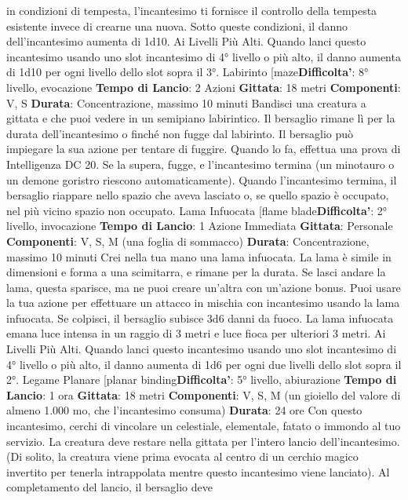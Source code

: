 \begin{multicols}{2}
in condizioni di tempesta, l’incantesimo ti fornisce il
controllo della tempesta esistente invece di crearne una
nuova. Sotto queste condizioni, il danno
dell’incantesimo aumenta di 1d10.
Ai Livelli Più Alti. Quando lanci questo incantesimo
usando uno slot incantesimo di 4° livello o più alto, il
danno aumenta di 1d10 per ogni livello dello slot sopra
il 3°.
Labirinto
[maze\textbf{Difficolta'}:
8° livello, evocazione
\textbf{Tempo di Lancio}: 2 Azioni
\textbf{Gittata}: 18 metri
\textbf{Componenti}: V, S
\textbf{Durata}: Concentrazione, massimo 10 minuti
Bandisci una creatura a gittata e che puoi vedere in un
semipiano labirintico. Il bersaglio rimane lì per la durata
dell’incantesimo o finché non fugge dal labirinto.
Il bersaglio può impiegare la sua azione per tentare di
fuggire. Quando lo fa, effettua una prova di Intelligenza
DC 20. Se la supera, fugge, e l’incantesimo termina (un
minotauro o un demone goristro riescono
automaticamente).
Quando l’incantesimo termina, il bersaglio riappare
nello spazio che aveva lasciato o, se quello spazio è
occupato, nel più vicino spazio non occupato.
Lama Infuocata
[flame blade\textbf{Difficolta'}:
2° livello, invocazione
\textbf{Tempo di Lancio}: 1 Azione Immediata
\textbf{Gittata}: Personale
\textbf{Componenti}: V, S, M (una foglia di sommacco)
\textbf{Durata}: Concentrazione, massimo 10 minuti
Crei nella tua mano una lama infuocata. La lama è
simile in dimensioni e forma a una scimitarra, e rimane
per la durata. Se lasci andare la lama, questa sparisce,
ma ne puoi creare un’altra con un’azione bonus.
Puoi usare la tua azione per effettuare un attacco in
mischia con incantesimo usando la lama infuocata. Se
colpisci, il bersaglio subisce 3d6 danni da fuoco.
La lama infuocata emana luce intensa in un raggio di 3
metri e luce fioca per ulteriori 3 metri.
Ai Livelli Più Alti. Quando lanci questo incantesimo
usando uno slot incantesimo di 4° livello o più alto, il
danno aumenta di 1d6 per ogni due livelli dello slot
sopra il 2°.
Legame Planare
[planar binding\textbf{Difficolta'}:
5° livello, abiurazione
\textbf{Tempo di Lancio}: 1 ora
\textbf{Gittata}: 18 metri
\textbf{Componenti}: V, S, M (un gioiello del valore di almeno
1.000 mo, che l’incantesimo consuma)
\textbf{Durata}: 24 ore
Con questo incantesimo, cerchi di vincolare un
celestiale, elementale, fatato o immondo al tuo servizio.
La creatura deve restare nella gittata per l’intero lancio
dell’incantesimo. (Di solito, la creatura viene prima
evocata al centro di un cerchio magico invertito per
tenerla intrappolata mentre questo incantesimo viene
lanciato). Al completamento del lancio, il bersaglio deve

\end{multicols}
